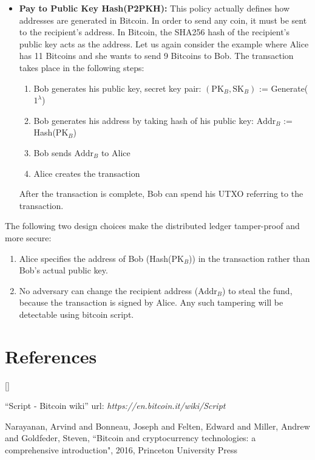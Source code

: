 \documentclass[twoside]{article}
\def\beginrefs{\begin{list}%
		{[\arabic{equation}]}{\usecounter{equation}
			\setlength{\leftmargin}{2.0truecm}\setlength{\labelsep}{0.4truecm}%
			\setlength{\labelwidth}{1.6truecm}}}
\def\endrefs{\end{list}}
\def\bibentry#1{\item[\hbox{[#1]}]}
\begin{document}
\begin{itemize}
		
		\item \textbf{Pay to Public Key Hash(P2PKH):} This policy actually defines how addresses are generated in Bitcoin. In order to send any coin, it must be sent to the recipient's address. In Bitcoin, the SHA256 hash of the recipient's public key acts as the address. 
		Let us again consider the example where Alice has 11 Bitcoins and she wants to send 9 Bitcoins to Bob. The transaction takes place in the following steps: 
		\begin{enumerate}
			\item Bob generates his public key, secret key pair: $(\text{PK}_{B},\text{SK}_{B})$ := Generate($1^\lambda$)
			\item Bob generates his address by taking hash of his public key: $\text{Addr}_{B}$ := Hash($\text{PK}_{B}$)
			\item Bob sends  $\text{Addr}_{B}$ to Alice
			\item Alice creates the transaction
		\end{enumerate}
		After the transaction is complete, Bob can spend his UTXO referring to the transaction.
	\end{itemize}
	
	The following two design choices make the distributed ledger tamper-proof and more secure: 
	\begin{enumerate}
		\item Alice specifies the address of Bob (Hash($\text{PK}_{B}$)) in the transaction rather than Bob's actual public key.
		\item No adversary can change the recipient address ($\text{Addr}_{B}$) to steal the fund, because the transaction is signed by Alice. Any such tampering will be detectable using bitcoin script.
	\end{enumerate}
	
	\section*{References}
	\beginrefs
	\bibentry{1}
	``Script - Bitcoin wiki'' url:
	{\it https://en.bitcoin.it/wiki/Script}
	
	\bibentry{2}
	Narayanan, Arvind and Bonneau, Joseph and Felten, Edward and Miller, Andrew and Goldfeder, Steven,
	``Bitcoin and cryptocurrency technologies: a comprehensive introduction", 2016, Princeton University Press
	
	
	
	\endrefs
\end{document}
